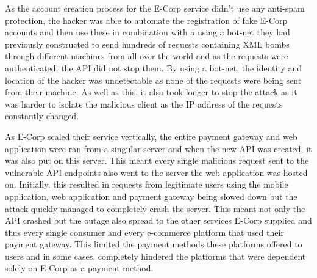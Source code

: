 \documentclass[]{report}
\begin{document}
As the account creation process for the E-Corp service didn't use any anti-spam protection, the hacker was able to automate the registration of fake E-Corp accounts and then use these in combination with a using a bot-net they had previously constructed to send hundreds of requests containing XML bombs through different machines from all over the world and as the requests were authenticated, the API did not stop them. By using a bot-net, the identity and location of the hacker was undetectable as none of the requests were being sent from their machine. As well as this, it also took longer to stop the attack as it was harder to isolate the malicious client as the IP address of the requests constantly changed. 

As E-Corp scaled their service vertically, the entire payment gateway and web application were ran from a singular server and when the new API was created, it was also put on this server. This meant every single malicious request sent to the vulnerable API endpoints also went to the server the web application was hosted on. Initially, this resulted in requests from legitimate users using the mobile application, web application and payment gateway being slowed down but the attack quickly managed to completely crash the server. This meant not only the API crashed but the outage also spread to the other services E-Corp supplied and thus every single consumer and every e-commerce platform that used their payment gateway. This limited the payment methods these platforms offered to users and in some cases, completely hindered the platforms that were dependent solely on E-Corp as a payment method.
	
\end{document}
